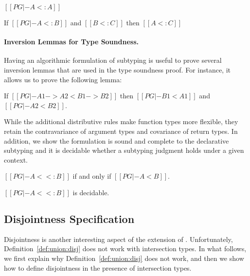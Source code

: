 \begin{lemma}
  $[[PG |- A <: A]]$
\label{lemma:union:inter:sub:refl}
\end{lemma}

\begin{lemma}
  If $[[PG |- A <: B]]$ and $[[B <: C]]$ then $[[A <: C]]$
\label{lemma:union:inter:sub:trans}
\end{lemma}

\paragraph{Inversion Lemmas for Type Soundness.}
Having an algorithmic formulation of subtyping is useful to
prove several inversion lemmas that are used in the type soundness proof.
For instance, it allows us to prove the following lemma:

\begin{lemma}\label{lemma:arrow_inv}
  If $[[PG |- A1->A2 < B1->B2]]$ then $[[PG |- B1 < A1]]$ and $[[PG |- A2 < B2]]$.
\end{lemma}

\noindent While the additional distributive rules make function types
more flexible, they retain the contravariance of argument types and
covariance of return types.
In addition, we show the formulation is sound and complete to the declarative
subtyping and it is decidable whether a subtyping judgment holds under a
given context.

\begin{lemma}\label{lemma:subtyping-equiv} %
    $[[PG |- A <<: B]]$ if and only if $[[PG |- A < B]]$.
\end{lemma}

\begin{lemma}\label{lemma:subtyping-decidable}
    $[[PG |- A <<: B]]$ is decidable.
\end{lemma}


\subsection{Disjointness Specification}
\label{sec:inter:disj}
Disjointness is another interesting aspect of the extension of \name.
Unfortunately, Definition~\ref{def:union:disj} does not work with intersection
types. In what follows, we first explain why Definition~\ref{def:union:disj} does not work, and then
we show how to define disjointness in the presence of intersection types.

